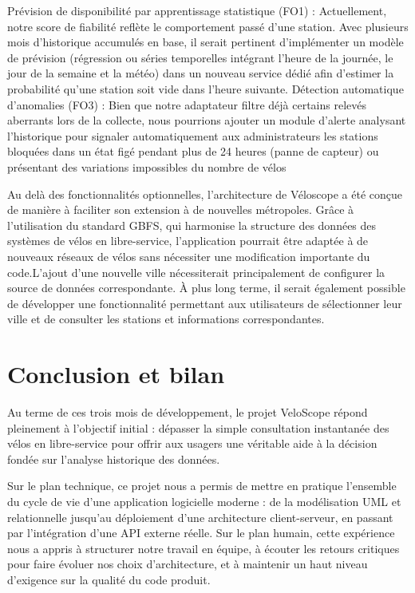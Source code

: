 \documentclass[
  french,
  11pt,
  a4paper,
]{article}
\begin{document}
Prévision de disponibilité par apprentissage statistique (FO1) :
Actuellement, notre score de fiabilité reflète le comportement passé
d'une station. Avec plusieurs mois d'historique accumulés en base, il
serait pertinent d'implémenter un modèle de prévision (régression ou
séries temporelles intégrant l'heure de la journée, le jour de la
semaine et la météo) dans un nouveau service dédié afin d'estimer la
probabilité qu'une station soit vide dans l'heure suivante. Détection
automatique d'anomalies (FO3) : Bien que notre adaptateur filtre déjà
certains relevés aberrants lors de la collecte, nous pourrions ajouter
un module d'alerte analysant l'historique pour signaler automatiquement
aux administrateurs les stations bloquées dans un état figé pendant plus
de 24 heures (panne de capteur) ou présentant des variations impossibles
du nombre de vélos

Au delà des fonctionnalités optionnelles, l'architecture de Véloscope a
été conçue de manière à faciliter son extension à de nouvelles
métropoles. Grâce à l'utilisation du standard GBFS, qui harmonise la
structure des données des systèmes de vélos en libre-service,
l'application pourrait être adaptée à de nouveaux réseaux de vélos sans
nécessiter une modification importante du code.L'ajout d'une nouvelle
ville nécessiterait principalement de configurer la source de données
correspondante. À plus long terme, il serait également possible de
développer une fonctionnalité permettant aux utilisateurs de
sélectionner leur ville et de consulter les stations et informations
correspondantes.

\pagebreak

\section{Conclusion et bilan}\label{conclusion-et-bilan}

Au terme de ces trois mois de développement, le projet VeloScope répond
pleinement à l'objectif initial : dépasser la simple consultation
instantanée des vélos en libre-service pour offrir aux usagers une
véritable aide à la décision fondée sur l'analyse historique des
données.

Sur le plan technique, ce projet nous a permis de mettre en pratique
l'ensemble du cycle de vie d'une application logicielle moderne : de la
modélisation UML et relationnelle jusqu'au déploiement d'une
architecture client-serveur, en passant par l'intégration d'une API
externe réelle. Sur le plan humain, cette expérience nous a appris à
structurer notre travail en équipe, à écouter les retours critiques pour
faire évoluer nos choix d'architecture, et à maintenir un haut niveau
d'exigence sur la qualité du code produit.
\end{document}

